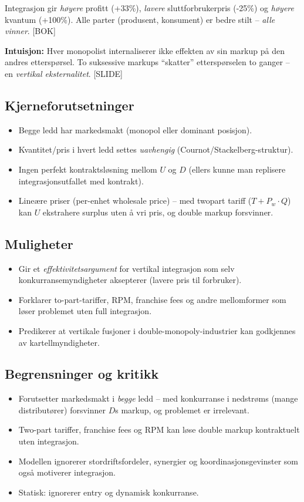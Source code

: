Integrasjon gir \emph{høyere} profitt (+33\%), \emph{lavere} sluttforbrukerpris (-25\%) og \emph{høyere} kvantum (+100\%). Alle parter (produsent, konsument) er bedre stilt -- \emph{alle vinner}. [BOK]

\textbf{Intuisjon:} Hver monopolist internaliserer ikke effekten av sin markup på den andres etterspørsel. To suksessive markups ``skatter'' etterspørselen to ganger -- en \emph{vertikal eksternalitet}. [SLIDE]

\subsection*{Kjerneforutsetninger}
\begin{itemize}
\item Begge ledd har markedsmakt (monopol eller dominant posisjon).
\item Kvantitet/pris i hvert ledd settes \emph{uavhengig} (Cournot/Stackelberg-struktur).
\item Ingen perfekt kontraktsløsning mellom $U$ og $D$ (ellers kunne man replisere integrasjonsutfallet med kontrakt).
\item Lineære priser (per-enhet wholesale price) -- med twopart tariff ($T + P_w \cdot Q$) kan $U$ ekstrahere surplus uten å vri pris, og double markup forsvinner.
\end{itemize}

\subsection*{Muligheter}
\begin{itemize}
\item Gir et \emph{effektivitetsargument} for vertikal integrasjon som selv konkurransemyndigheter aksepterer (lavere pris til forbruker).
\item Forklarer to-part-tariffer, RPM, franchise fees og andre mellomformer som løser problemet uten full integrasjon.
\item Predikerer at vertikale fusjoner i double-monopoly-industrier kan godkjennes av kartellmyndigheter.
\end{itemize}

\subsection*{Begrensninger og kritikk}
\begin{itemize}
\item Forutsetter markedsmakt i \emph{begge} ledd -- med konkurranse i nedstrøms (mange distributører) forsvinner $D$s markup, og problemet er irrelevant.
\item Two-part tariffer, franchise fees og RPM kan løse double markup kontraktuelt uten integrasjon.
\item Modellen ignorerer stordriftsfordeler, synergier og koordinasjonsgevinster som også motiverer integrasjon.
\item Statisk: ignorerer entry og dynamisk konkurranse.
\end{itemize}

